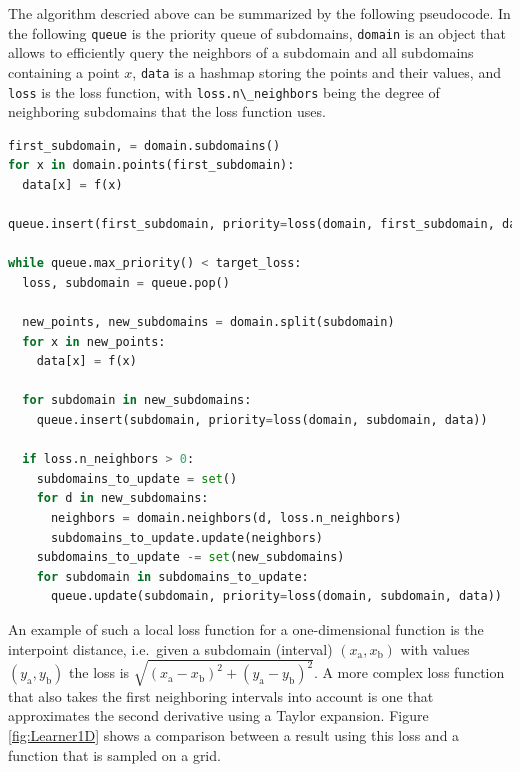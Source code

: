 
The algorithm descried above can be summarized by the following pseudocode.
In the following \passthrough{\lstinline!queue!} is the priority queue of subdomains, \passthrough{\lstinline!domain!} is an object that allows to efficiently query the neighbors of a subdomain and all subdomains containing a point $x$, \passthrough{\lstinline!data!} is a hashmap storing the points and their values, and \passthrough{\lstinline!loss!} is the loss function, with \passthrough{\lstinline!loss.n\_neighbors!} being the degree of neighboring subdomains that the loss function uses.

\begin{lstlisting}[language=Python]
first_subdomain, = domain.subdomains()
for x in domain.points(first_subdomain):
  data[x] = f(x)

queue.insert(first_subdomain, priority=loss(domain, first_subdomain, data))

while queue.max_priority() < target_loss:
  loss, subdomain = queue.pop()

  new_points, new_subdomains = domain.split(subdomain)
  for x in new_points:
    data[x] = f(x)

  for subdomain in new_subdomains:
    queue.insert(subdomain, priority=loss(domain, subdomain, data))

  if loss.n_neighbors > 0:
    subdomains_to_update = set()
    for d in new_subdomains:
      neighbors = domain.neighbors(d, loss.n_neighbors)
      subdomains_to_update.update(neighbors)
    subdomains_to_update -= set(new_subdomains)
    for subdomain in subdomains_to_update:
      queue.update(subdomain, priority=loss(domain, subdomain, data))
\end{lstlisting}


An example of such a local loss function for a one-dimensional function is the interpoint distance, i.e.~given a subdomain (interval) $(x_\textrm{a}, x_\textrm{b})$ with values $(y_\textrm{a}, y_\textrm{b})$ the loss is $\sqrt{(x_\textrm{a} - x_\textrm{b})^2 + (y_\textrm{a} - y_\textrm{b})^2}$.
A more complex loss function that also takes the first neighboring intervals into account is one that approximates the second derivative using a Taylor expansion.
Figure \ref{fig:Learner1D} shows a comparison between a result using this loss and a function that is sampled on a grid.

